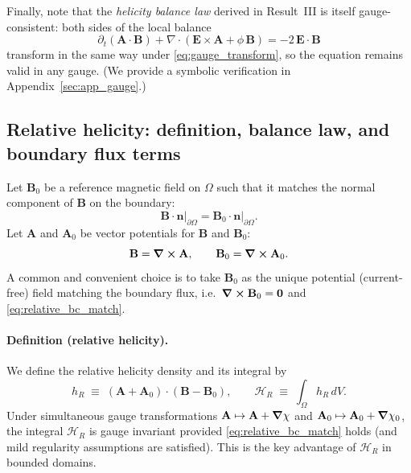 \documentclass[11pt]{article}
\theoremstyle{plain}
\theoremstyle{definition}
\theoremstyle{remark}
\newcommand{\diver}{\nabla\cdot}
\newcommand{\A}{\mathbf{A}}
\newcommand{\B}{\mathbf{B}}
\newcommand{\E}{\mathbf{E}}
\begin{document}
Finally, note that the \emph{helicity balance law} derived in Result~III is itself gauge-consistent:
both sides of the local balance
\[
\partial_t(\A\cdot\B) + \diver(\E\times\A + \phi\,\B) = -2\,\E\cdot\B
\]
transform in the same way under \eqref{eq:gauge_transform}, so the equation remains valid in any gauge.
(We provide a symbolic verification in Appendix~\ref{sec:app_gauge}.)

\subsection{Relative helicity: definition, balance law, and boundary flux terms}\label{sec:result_gauge_relative}
Let $\B_0$ be a reference magnetic field on $\Omega$ such that it matches the normal component of $\B$
on the boundary:
\begin{equation}\label{eq:relative_bc_match}
  \B\cdot\mathbf{n}\big|_{\partial\Omega} = \B_0\cdot\mathbf{n}\big|_{\partial\Omega}.
\end{equation}
Let $\A$ and $\A_0$ be vector potentials for $\B$ and $\B_0$:
\begin{equation}\label{eq:relative_potentials}
  \B=\curl\A,
  \qquad
  \B_0=\curl\A_0.
\end{equation}
A common and convenient choice is to take $\B_0$ as the unique potential (current-free) field matching
the boundary flux, i.e.\ $\curl\B_0=\mathbf{0}$ and \eqref{eq:relative_bc_match}.

\paragraph{Definition (relative helicity).}
We define the relative helicity density and its integral by \cite{FinnAntonsen1985}
\begin{equation}\label{eq:relative_helicity_def}
  h_R \;\equiv\; (\A+\A_0)\cdot(\B-\B_0),
  \qquad
  \mathcal{H}_R \;\equiv\; \int_{\Omega} h_R\,dV.
\end{equation}
Under simultaneous gauge transformations $\A\mapsto\A+\grad\chi$ and $\A_0\mapsto\A_0+\grad\chi_0$,
the integral $\mathcal{H}_R$ is gauge invariant provided \eqref{eq:relative_bc_match} holds (and mild
regularity assumptions are satisfied). This is the key advantage of $\mathcal{H}_R$ in bounded domains.
\end{document}
